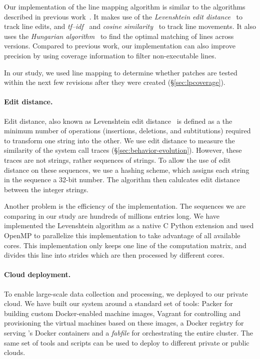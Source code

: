Our implementation of the line mapping algorithm is similar to the
algorithms described in previous
work~\cite{szz:msr05,szz:ase06,change-source-code:msr07,szzrevisited:defects08}.
It makes use of the \emph{Levenshtein edit
  distance}~\cite{levenshtein1966binary} to track line edits, and
\emph{tf--idf}~\cite{tf-idf} and \emph{cosine
  similarity}~\cite{cosinesimilarity} to track line movements.  It
also uses the \emph{Hungarian algorithm}~\cite{hungarian} to find the
optimal matching of lines across versions.  Compared to previous work,
our implementation can also improve precision by using coverage information to filter
non-executable lines.


In our study, we used line mapping to determine whether patches are
tested within the next few revisions after they were created
(\S\ref{sec:lpcoverage}).

\paragraph{Edit distance.} Edit distance, also known as Levenshtein edit
distance~\cite{levenshtein1966binary} is defined as a the minimum number of
operations (insertions, deletions, and subtitutions) required to transform one
string into the other. We use edit distance to measure the similarity of the
system call traces (\S\ref{sec:behavior-evolution}). However, these traces are
not strings, rather sequences of strings. To allow the use of edit distance on
these sequences, we use a hashing scheme, which assigns each string in the
sequence a 32-bit number. The algorithm then calulcates edit distance between
the integer strings.

Another problem is the efficiency of the implementation. The sequences we are
comparing in our study are hundreds of millions entries long. We have
implemented the Levenshtein algorithm as a native C Python extension and used
OpenMP to parallelize this implementation to take advantage of all available
cores. This implementation only keeps one line of the computation matrix, and
divides this line into strides which are then processed by different cores.

\paragraph{Cloud deployment.} To enable large-scale data collection and
processing, we deployed \covrig to our private cloud.  We have built our
system around a standard set of tools: Packer for building custom
Docker-enabled machine images, Vagrant for controlling and provisioning
the virtual machines based on these images, a Docker registry for
serving \covrig's Docker containers and a {\em fabfile} for
orchestrating the entire cluster. The same set of tools and scripts
can be used to deploy \covrig to different private or public clouds.

